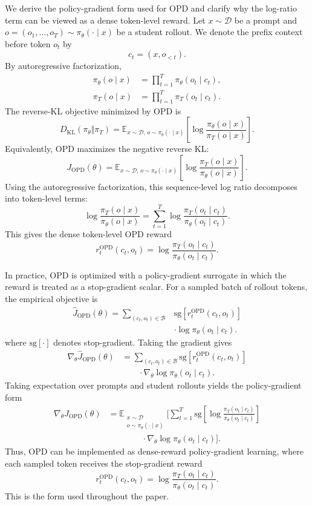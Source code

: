 We derive the policy-gradient form used for OPD and clarify why the log-ratio term can be viewed as a dense token-level reward. Let \(x\sim\mathcal{D}\) be a prompt and \(o=(o_1,\ldots,o_T)\sim\pi_\theta(\cdot\mid x)\) be a student rollout. We denote the prefix context before token \(o_t\) by
\[
c_t = (x,o_{<t}).
\]
By autoregressive factorization,
\[
\begin{aligned}
\pi_\theta(o\mid x)
&= \prod_{t=1}^{T}\pi_\theta(o_t\mid c_t), \\
\pi_T(o\mid x)
&= \prod_{t=1}^{T}\pi_T(o_t\mid c_t).
\end{aligned}
\]
The reverse-KL objective minimized by OPD is
\[
D_{\mathrm{KL}}(\pi_\theta\Vert\pi_T)
=
\mathbb{E}_{x\sim\mathcal{D},\,o\sim\pi_\theta(\cdot\mid x)}
\left[
\log \frac{\pi_\theta(o\mid x)}{\pi_T(o\mid x)}
\right].
\]
Equivalently, OPD maximizes the negative reverse KL:
\[
J_{\mathrm{OPD}}(\theta)
=
\mathbb{E}_{x\sim\mathcal{D},\,o\sim\pi_\theta(\cdot\mid x)}
\left[
\log \frac{\pi_T(o\mid x)}{\pi_\theta(o\mid x)}
\right].
\]
Using the autoregressive factorization, this sequence-level log ratio decomposes into token-level terms:
\[
\log \frac{\pi_T(o\mid x)}{\pi_\theta(o\mid x)}
=
\sum_{t=1}^{T}
\log
\frac{\pi_T(o_t\mid c_t)}
     {\pi_\theta(o_t\mid c_t)}.
\]
This gives the dense token-level OPD reward
\[
r_t^{\mathrm{OPD}}(c_t,o_t)
=
\log
\frac{\pi_T(o_t\mid c_t)}
     {\pi_\theta(o_t\mid c_t)}.
\]

In practice, OPD is optimized with a policy-gradient surrogate in which the reward is treated as a stop-gradient scalar. For a sampled batch of rollout tokens, the empirical objective is
\[
\begin{aligned}
\widehat{J}_{\mathrm{OPD}}(\theta)
=
\sum_{(c_t,o_t)\in\mathcal{B}}
&\mathrm{sg}\!\left[
r_t^{\mathrm{OPD}}(c_t,o_t)
\right] \\
&\cdot \log \pi_\theta(o_t\mid c_t).
\end{aligned}
\]
where \(\mathrm{sg}[\cdot]\) denotes stop-gradient. Taking the gradient gives
\[
\begin{aligned}
\nabla_\theta \widehat{J}_{\mathrm{OPD}}(\theta)
&=
\sum_{(c_t,o_t)\in\mathcal{B}}
\mathrm{sg}\!\left[
r_t^{\mathrm{OPD}}(c_t,o_t)
\right] \\
&\qquad\cdot
\nabla_\theta \log \pi_\theta(o_t\mid c_t).
\end{aligned}
\]
Taking expectation over prompts and student rollouts yields the policy-gradient form
\[
\begin{aligned}
\nabla_\theta J_{\mathrm{OPD}}(\theta)
&=
\mathbb{E}_{\substack{
x\sim\mathcal{D}\\
o\sim\pi_\theta(\cdot\mid x)
}}
\Bigg[
\sum_{t=1}^{T}
\mathrm{sg}\!\left[
\log
\frac{\pi_T(o_t\mid c_t)}
     {\pi_\theta(o_t\mid c_t)}
\right] \\
&\qquad\qquad\cdot
\nabla_\theta \log \pi_\theta(o_t\mid c_t)
\Bigg].
\end{aligned}
\]
Thus, OPD can be implemented as dense-reward policy-gradient learning, where each sampled token receives the stop-gradient reward
\[
r_t^{\mathrm{OPD}}(c_t,o_t)
=
\log
\frac{\pi_T(o_t\mid c_t)}
     {\pi_\theta(o_t\mid c_t)}.
\]
This is the form used throughout the paper.